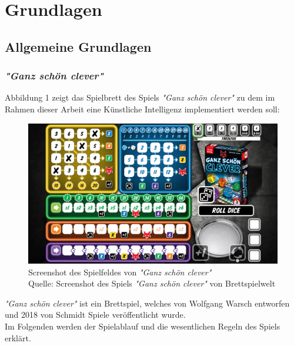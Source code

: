 \section{Grundlagen}
\subsection{Allgemeine Grundlagen}
\subsubsection{\textit{"Ganz schön clever"}}
	Abbildung 1 zeigt das Spielbrett des Spiels \textit{"Ganz schön clever"} zu dem im Rahmen dieser Arbeit eine Künstliche Intelligenz implementiert werden soll:
	\nopagebreak
\begin{figure}[H]
	\includegraphics[width=1\textwidth]{Bilder/gsc} 
	\caption[Screenshot des Spielfeldes von \textit{"Ganz schön clever"}]{Screenshot des Spielfeldes von \textit{"Ganz schön clever"}\\ Quelle: Screenshot des Spiels \textit{"Ganz schön clever"} von Brettspielwelt}
\end{figure}

\textit{"Ganz schön clever"} ist ein Brettspiel, welches von Wolfgang Warsch entworfen und 2018 von Schmidt Spiele veröffentlicht wurde.\\

Im Folgenden werden der Spielablauf und die wesentlichen Regeln des Spiels erklärt.

